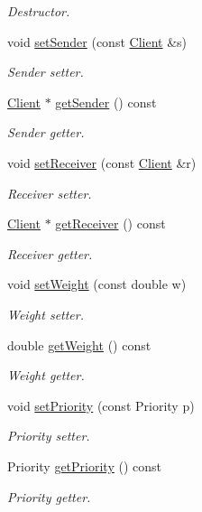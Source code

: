 \begin{DoxyCompactItemize}
\begin{DoxyCompactList}\small\item\em Destructor. \end{DoxyCompactList}\item 
void \hyperlink{classPackage_aeb8cb5056e6ad6850147c7ad850e60d9}{set\+Sender} (const \hyperlink{classClient}{Client} \&s)
\begin{DoxyCompactList}\small\item\em Sender setter. \end{DoxyCompactList}\item 
\hyperlink{classClient}{Client} $\ast$ \hyperlink{classPackage_a1e603126edbbd5c82c676eb0e6805554}{get\+Sender} () const 
\begin{DoxyCompactList}\small\item\em Sender getter. \end{DoxyCompactList}\item 
void \hyperlink{classPackage_a94ad72f9e091e10b494ab0131be7998a}{set\+Receiver} (const \hyperlink{classClient}{Client} \&r)
\begin{DoxyCompactList}\small\item\em Receiver setter. \end{DoxyCompactList}\item 
\hyperlink{classClient}{Client} $\ast$ \hyperlink{classPackage_a02e9aee9f9e10b6b6ba124df61bd289d}{get\+Receiver} () const 
\begin{DoxyCompactList}\small\item\em Receiver getter. \end{DoxyCompactList}\item 
void \hyperlink{classPackage_ab5fc0c4ff15151713ff49f75caa81a13}{set\+Weight} (const double w)
\begin{DoxyCompactList}\small\item\em Weight setter. \end{DoxyCompactList}\item 
double \hyperlink{classPackage_a2da083a8cab4c978c22c49ac46226aee}{get\+Weight} () const 
\begin{DoxyCompactList}\small\item\em Weight getter. \end{DoxyCompactList}\item 
void \hyperlink{classPackage_a2a3ec22692ea9449aba6c4f53e826427}{set\+Priority} (const Priority p)
\begin{DoxyCompactList}\small\item\em Priority setter. \end{DoxyCompactList}\item 
Priority \hyperlink{classPackage_accf52df9d08053e7c1c126d747e6beb0}{get\+Priority} () const 
\begin{DoxyCompactList}\small\item\em Priority getter. \end{DoxyCompactList}\end{DoxyCompactItemize}


